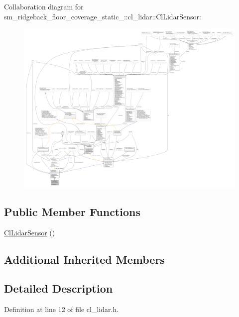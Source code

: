 Collaboration diagram for sm\+\_\+ridgeback\+\_\+floor\+\_\+coverage\+\_\+static\+\_\+:\+:cl\+\_\+lidar\+:\+:Cl\+Lidar\+Sensor\+:
\nopagebreak
\begin{figure}[H]
\begin{center}
\leavevmode
\includegraphics[width=350pt]{classsm__ridgeback__floor__coverage__static__1_1_1cl__lidar_1_1ClLidarSensor__coll__graph}
\end{center}
\end{figure}
\subsection*{Public Member Functions}
\begin{DoxyCompactItemize}
\item 
\hyperlink{classsm__ridgeback__floor__coverage__static__1_1_1cl__lidar_1_1ClLidarSensor_a59237b94ce39ca8478f818db90836c64}{Cl\+Lidar\+Sensor} ()
\end{DoxyCompactItemize}
\subsection*{Additional Inherited Members}


\subsection{Detailed Description}


Definition at line 12 of file cl\+\_\+lidar.\+h.



